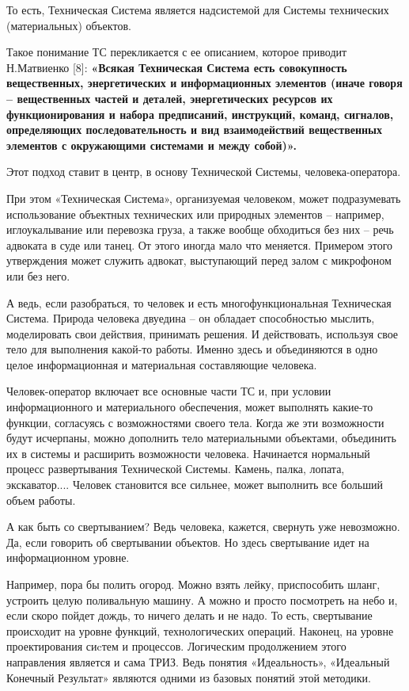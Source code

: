 \documentclass[11pt,a4paper]{article}
\begin{document}
То есть, Техническая Система является надсистемой для Системы технических
(материальных) объектов.

Такое понимание ТС перекликается с ее описанием, которое приводит Н.Матвиенко
[8]: \textbf{«Всякая Техническая Система есть совокупность вещественных,
  энергетических и информационных элементов (иначе говоря – вещественных
  частей и деталей, энергетических ресурсов их функционирования и набора
  предписаний, инструкций, команд, сигналов, определяющих последовательность и
  вид взаимодействий вещественных элементов с окружающими системами и между
  собой)».}

Этот подход ставит в центр, в основу Технической Системы, человека-оператора.

При этом «Техническая Система», организуемая человеком, может подразумевать
использование объектных технических или природных элементов – например,
иглоукалывание или перевозка груза, а также вообще обходиться без них – речь
адвоката в суде или танец. От этого иногда мало что меняется. Примером этого
утверждения может служить адвокат, выступающий перед залом с микрофоном или
без него.

А ведь, если разобраться, то человек и есть многофункциональная Техническая
Система. Природа человека двуедина – он обладает способностью мыслить,
моделировать свои действия, принимать решения. И действовать, используя свое
тело для выполнения какой-то работы. Именно здесь и объединяются в одно целое
информационная и материальная составляющие человека.


Человек-оператор включает все основные части ТС и, при условии информационного
и материального обеспечения, может выполнять какие-то функции, согласуясь с
возможностями своего тела. Когда же эти возможности будут исчерпаны, можно
дополнить тело материальными объектами, объединить их в системы и расширить
возможности человека. Начинается нормальный процесс развертывания Технической
Системы. Камень, палка, лопата, экскаватор.... Человек становится все сильнее,
может выполнить все больший объем работы.


А как быть со свертыванием? Ведь человека, кажется, свернуть уже
невозможно. Да, если говорить об свертывании объектов. Но здесь свертывание
идет на информационном уровне.

Например, пора бы полить огород. Можно взять лейку, приспособить шланг,
устроить целую поливальную машину. А можно и просто посмотреть на небо и, если
скоро пойдет дождь, то ничего делать и не надо. То есть, свертывание
происходит на уровне функций, технологических операций. Наконец, на уровне
проектирования сиcтем и процессов. Логическим продолжением этого направления
является и сама ТРИЗ. Ведь понятия «Идеальность», «Идеальный Конечный
Результат» являются одними из базовых понятий этой методики.
\end{document}
